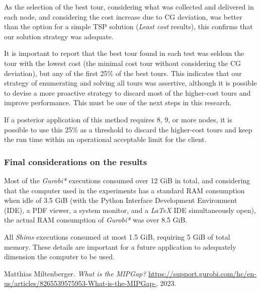 \documentclass[preprint]{elsarticle}
\begin{document}
{\begin{table}[H]
\begin{tabular}{ccccccccc}
\bottomrule
\end{tabular}
\normalsize
\end{table}

As the selection of the best tour, considering what was collected and delivered in each node, and considering the cost increase due to CG deviation, was better than the option for a simple TSP solution (\textit{Least cost} results), this confirms that our solution strategy was adequate.

It is important to report that the best tour found in each test was seldom the tour with the lowest cost (the minimal cost tour without considering the CG deviation), but any of the first 25\% of the best tours. This indicates that our strategy of enumerating and solving all tours was assertive, although it is possible to devise a more proactive strategy to discard most of the higher-cost tours and improve performance. This must be one of the next steps in this research.

If a posterior application of this method requires 8, 9, or more nodes, it is possible to use this 25\% as a threshold to discard the higher-cost tours and keep the run time within an operational acceptable limit for the client.

\subsubsection{Final considerations on the results}

Most of the {\it Gurobi*} executions consumed over 12 GiB in total, and considering that the computer used in the experiments has a standard RAM consumption when idle of 3.5 GiB (with the Python Interface Development Environment (IDE), a PDF viewer, a system monitor, and a {\it LaTeX} IDE simultaneously open), the actual RAM consumption of {\it Gurobi*} was over 8.5 GiB.

All {\it Shims} executions consumed at most 1.5 GiB, requiring 5 GiB of total memory.
These details are important for a future application to adequately dimension the computer to be used.

}

\begin{thebibliography}{00}
	
	 Matthias Miltenberger. {\it What is the MIPGap?} \url{https://support.gurobi.com/hc/en-us/articles/8265539575953-What-is-the-MIPGap-}, 2023.
	
\end{thebibliography}
\end{document}
